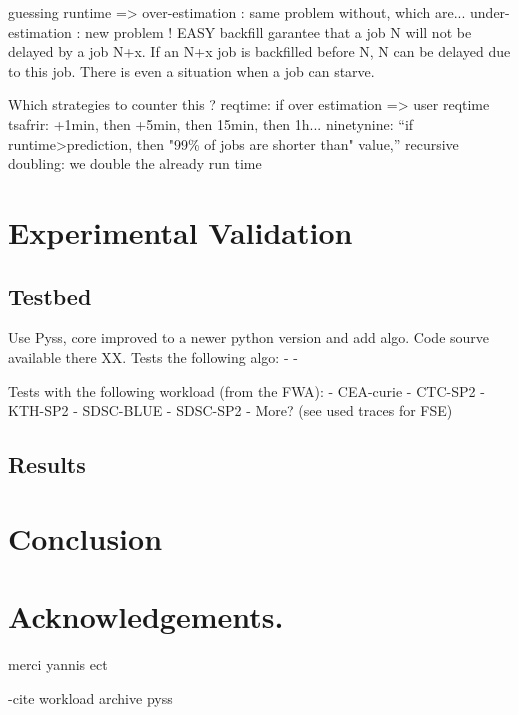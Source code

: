 \documentclass{llncs}
\begin{document}
guessing runtime =>
over-estimation : same problem without, which are...
under-estimation : new problem ! EASY backfill garantee that a job N will not be delayed by a job N+x.
If an N+x job is backfilled before N, N can be delayed due to this job. There is even a situation when a job can starve.

Which strategies to counter this ?
reqtime: if over estimation => user reqtime
tsafrir: +1min, then +5min, then 15min, then 1h...
ninetynine: ``if runtime>prediction, then "99\% of jobs are shorter than" value,''
recursive doubling: we double the already run time




\section{Experimental Validation}
\label{sec:experimental_validation}

\subsection{Testbed}
\label{sub:Testbed}
Use Pyss, core improved to a newer python version and add algo. Code sourve available there XX.
Tests the following algo:
-
-

Tests with the following workload (from the FWA):
- CEA-curie
- CTC-SP2
- KTH-SP2
- SDSC-BLUE
- SDSC-SP2
- More? (see used traces for FSE)


\subsection{Results}
\label{sub:Testbed}




\section{Conclusion}
\label{sec:conclusion}





\section*{Acknowledgements.}
\label{sec:ack}
merci yannis ect

-cite
workload archive
pyss




\end{document}
